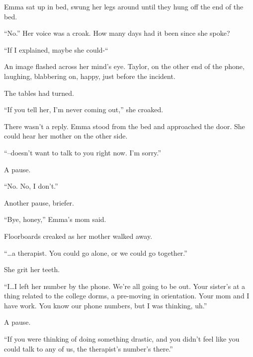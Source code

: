 Emma sat up in bed, swung her legs around until they hung off the end of the bed.



``No.''  Her voice was a croak.  How many days had it been since she spoke?



``If I explained, maybe she could-``



An image flashed across her mind's eye.  Taylor, on the other end of the phone, laughing, blabbering on, happy, just before the incident.



The tables had turned.



``If you tell her, I'm never coming out,'' she croaked.



There wasn't a reply.  Emma stood from the bed and approached the door.  She could hear her mother on the other side.



``--doesn't want to talk to you right now.  I'm sorry.''



A pause.



``No.  No, I don't.''



Another pause, briefer.



``Bye, honey,'' Emma's mom said.



Floorboards creaked as her mother walked away.



\sectionbreak



``\ldots{}a therapist.  You could go alone, or we could go together.''



She grit her teeth.



``I\ldots I left her number by the phone.  We're all going to be out.  Your sister's at a thing related to the college dorms, a pre-moving in orientation.  Your mom and I have work.  You know our phone numbers, but I was thinking, uh.''



A pause.



``If you were thinking of doing something drastic, and you didn't feel like you could talk to any of us, the therapist's number's there.''



